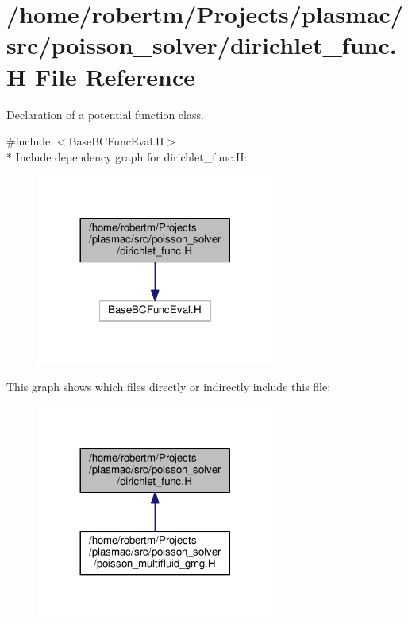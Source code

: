 \hypertarget{dirichlet__func_8H}{}\section{/home/robertm/\+Projects/plasmac/src/poisson\+\_\+solver/dirichlet\+\_\+func.H File Reference}
\label{dirichlet__func_8H}


Declaration of a potential function class.  


{\ttfamily \#include $<$Base\+B\+C\+Func\+Eval.\+H$>$}\\*
Include dependency graph for dirichlet\+\_\+func.\+H\+:\nopagebreak
\begin{figure}[H]
\begin{center}
\leavevmode
\includegraphics[width=221pt]{dirichlet__func_8H__incl}
\end{center}
\end{figure}
This graph shows which files directly or indirectly include this file\+:\nopagebreak
\begin{figure}[H]
\begin{center}
\leavevmode
\includegraphics[width=221pt]{dirichlet__func_8H__dep__incl}
\end{center}
\end{figure}
